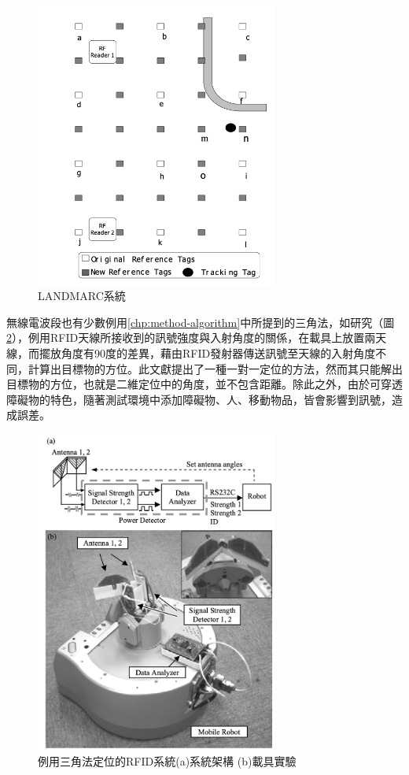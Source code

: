         \begin{figure}[h]
            \centering
            \includegraphics[width=8cm]{ch2pic/landmarc.png}
            \caption{LANDMARC系統\cite{landmarc}}
            \label{pic:landmarc}
        \end{figure}

        無線電波段也有少數例用\ref{chp:method-algorithm}中所提到的三角法，如\cite{case:rfid_1to1}研究（圖\ref{pic:rfid_1to1}），例用RFID天線所接收到的訊號強度與入射角度的關係，在載具上放置兩天線，而擺放角度有90度的差異，藉由RFID發射器傳送訊號至天線的入射角度不同，計算出目標物的方位。此文獻提出了一種一對一定位的方法，然而其只能解出目標物的方位，也就是二維定位中的角度，並不包含距離。除此之外，由於可穿透障礙物的特色，隨著測試環境中添加障礙物、人、移動物品，皆會影響到訊號，造成誤差。

        \begin{figure}[h]
            \centering
            \includegraphics[width=8cm]{ch2pic/rfid_1to1.png}
            \caption{例用三角法定位的RFID系統\cite{case:rfid_1to1}(a)系統架構 (b)載具實驗}
            \label{pic:rfid_1to1}
        \end{figure}
        
